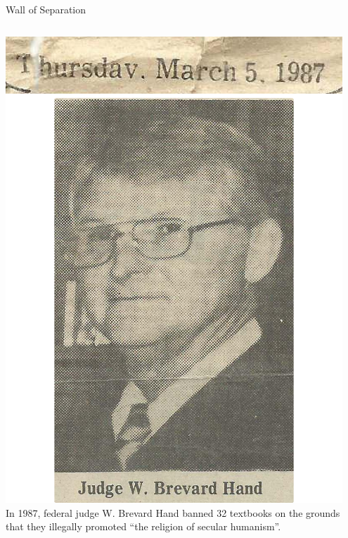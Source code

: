 \begin{frame}{Wall of Separation}
    \begin{columns}[onlytextwidth]
            \centering
            \includegraphics[width=0.95\textwidth]{img/1987JudgeRuling-clipped.png} \\

            In 1987, federal judge W. Brevard Hand banned 32 textbooks on the grounds that they illegally promoted ``the religion of secular humanism''.

    \end{columns}
\end{frame}


